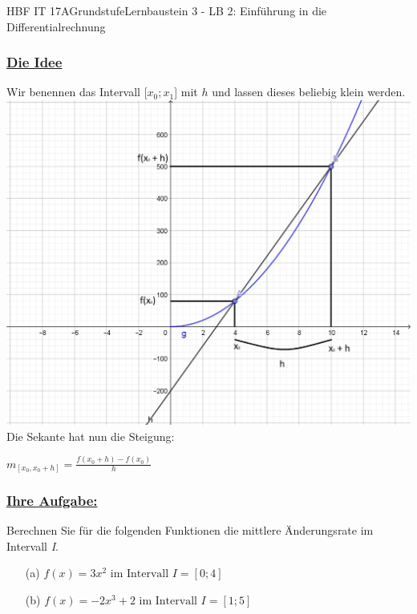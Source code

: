 \documentclass[11pt,twocolumn,oneside,openany,headings=optiontotoc,11pt,numbers=noenddot]{article}
\begin{document}
\begin{worksheet}{HBF IT 17A}{Grundstufe}{Lernbaustein 3 - LB 2: Einführung in die Differentialrechnung}
		\subsubsection*{\underline{Die Idee}}
		Wir benennen das Intervall [\(x_{0};x_{1}\)] mit \(h\) und lassen dieses beliebig klein werden.
		\includegraphics[scale=0.25]{Bilder/DifferenzenquotienthMeth.jpg}
		Die Sekante hat nun die Steigung:\\
		\begin{center}
			\(m_{[x_{0},x_{0}+h]} = \frac{f(x_{0}+h) - f(x_{0})}{h}\)
		\end{center}
		\subsubsection*{\underline{Ihre Aufgabe:}}
		Berechnen Sie für die folgenden Funktionen die mittlere Änderungsrate im Intervall \textit{I}.
		\begin{itemize}
			\itemsep0pt
		\item[(a)] \(f(x) = 3x^{2} \text{ im Intervall } I=[0;4]\)
			\item[(b)] \(f(x) = -2x^{3} + 2 \text{ im Intervall } I=[1;5]\)
		\end{itemize}
	\end{worksheet}
\end{document}
